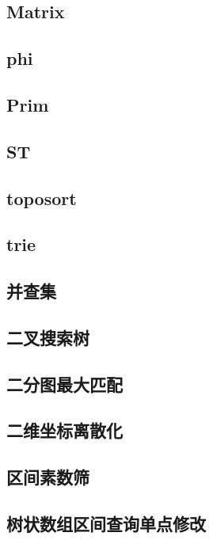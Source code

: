 \documentclass[10pt,a4paper]{article}
\begin{document}
\subsection{Matrix}

\subsection{phi}

\subsection{Prim}

\subsection{ST}

\subsection{toposort}

\subsection{trie}

\subsection{并查集}

\subsection{二叉搜索树}

\subsection{二分图最大匹配}

\subsection{二维坐标离散化}

\subsection{区间素数筛}

\subsection{树状数组区间查询单点修改}

\end{document}
